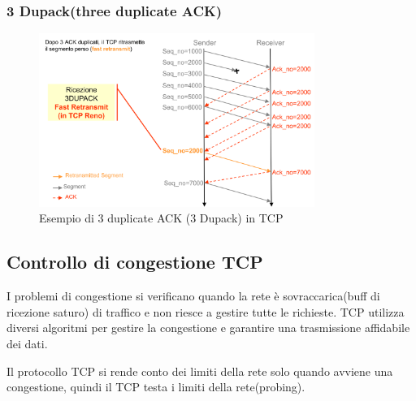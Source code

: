 \subsubsection{3 Dupack(three duplicate ACK)}
\begin{figure}[h!]
    \centering
    \includegraphics[width=0.8\textwidth]{images/3dupack.png}
    \caption{Esempio di 3 duplicate ACK (3 Dupack) in TCP}
    \label{fig:3dupack}
\end{figure}
\subsection{Controllo di congestione TCP}

I problemi di congestione si verificano quando la rete è sovraccarica(buff di ricezione saturo) di traffico e non riesce a gestire tutte le richieste. TCP utilizza diversi algoritmi per gestire la congestione e garantire una trasmissione affidabile dei dati.

Il protocollo TCP si rende conto dei limiti della rete solo quando avviene una congestione, quindi il TCP testa i limiti della rete(probing).


